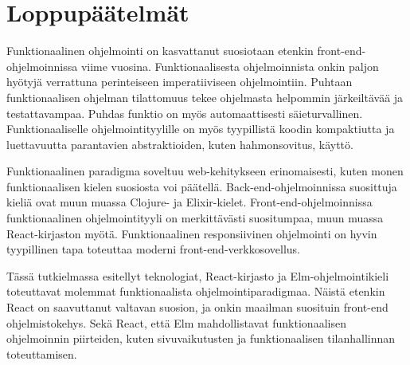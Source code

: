\chapter{Loppupäätelmät}
Funktionaalinen ohjelmointi on kasvattanut suosiotaan etenkin front-end-ohjelmoinnissa viime vuosina.
Funktionaalisesta ohjelmoinnista onkin paljon hyötyjä verrattuna perinteiseen imperatiiviseen ohjelmointiin. Puhtaan
funktionaalisen ohjelman tilattomuus tekee ohjelmasta helpommin järkeiltävää ja testattavampaa. Puhdas funktio on myös
automaattisesti säieturvallinen. Funktionaaliselle ohjelmointityylille on myös tyypillistä koodin kompaktiutta ja
luettavuutta parantavien abstraktioiden, kuten hahmonsovitus, käyttö.

Funktionaalinen paradigma soveltuu web-kehitykseen erinomaisesti, kuten monen funktionaalisen kielen suosiosta voi
päätellä. Back-end-ohjelmoinnissa suosittuja kieliä ovat muun muassa Clojure- ja Elixir-kielet. Front-end-ohjelmoinnissa
funktionaalinen ohjelmointityyli on merkittävästi suositumpaa, muun muassa React-kirjaston myötä. Funktionaalinen
responsiivinen ohjelmointi on hyvin tyypillinen tapa toteuttaa moderni front-end-verkkosovellus.

Tässä tutkielmassa esitellyt teknologiat, React-kirjasto ja Elm-ohjelmointikieli toteuttavat molemmat funktionaalista
ohjelmointiparadigmaa. Näistä etenkin React on saavuttanut valtavan suosion, ja onkin maailman suosituin front-end
ohjelmistokehys. Sekä React, että Elm mahdollistavat funktionaalisen ohjelmoinnin piirteiden, kuten sivuvaikutusten
ja funktionaalisen tilanhallinnan toteuttamisen.